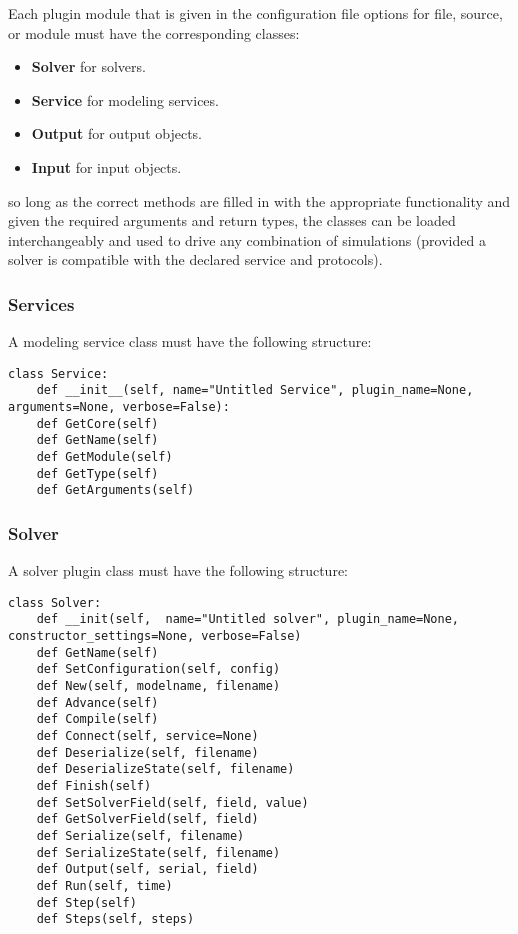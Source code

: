 \documentclass[12pt]{article}
\begin{document}
Each plugin module that is given in the configuration file options for file, source, or module must have the corresponding classes:

\begin{itemize}
	\item[] {\bf Solver} for solvers.
	\item[] {\bf Service} for modeling services.
	\item[] {\bf Output} for output objects.
	\item[] {\bf Input} for input objects.
\end{itemize}

so long as the correct methods are filled in with the appropriate functionality and given the required arguments and return types,  the classes can be loaded interchangeably and used to drive any combination of simulations (provided a solver is compatible with the declared service and protocols). 

\subsubsection*{Services}

A modeling service class must have the following structure:

\begin{verbatim}
class Service:
	def __init__(self, name="Untitled Service", plugin_name=None, arguments=None, verbose=False):
	def GetCore(self)
	def GetName(self)
	def GetModule(self)
	def GetType(self)
	def GetArguments(self)
\end{verbatim}

\subsubsection*{Solver}

A solver plugin class must have the following structure:

\begin{verbatim}
class Solver:
	def __init(self,  name="Untitled solver", plugin_name=None, constructor_settings=None, verbose=False)
	def GetName(self)
	def SetConfiguration(self, config)
	def New(self, modelname, filename)
	def Advance(self)
	def Compile(self)
	def Connect(self, service=None)
	def Deserialize(self, filename)
	def DeserializeState(self, filename)
	def Finish(self)
	def SetSolverField(self, field, value)
	def GetSolverField(self, field)
	def Serialize(self, filename)
	def SerializeState(self, filename)
	def Output(self, serial, field)
	def Run(self, time)
	def Step(self)
	def Steps(self, steps)
\end{verbatim}
\end{document}
